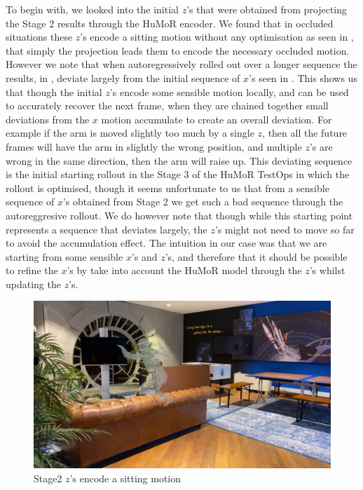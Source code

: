 To begin with, we looked into the initial $z$'s that were obtained from projecting the Stage 2 results through the HuMoR encoder. We found that in occluded situations these $z$'s encode a sitting motion without any optimisation as seen in , that simply the projection leads them to encode the necessary occluded motion. However we note that when autoregressively rolled out over a longer sequence the results, in , deviate largely from the initial sequence of $x$'s seen in . This shows us that though the initial $z$'s encode some sensible motion locally, and can be used to accurately recover the next frame, when they are chained together small deviations from the $x$ motion accumulate to create an overall deviation. For example if the arm is moved slightly too much by a single $z$, then all the future frames will have the arm in slightly the wrong position, and multiple $z$'s are wrong in the same direction, then the arm will raise up. This deviating sequence is the initial starting rollout in the Stage 3 of the HuMoR TestOps in which the rollout is optimised, though it seems unfortunate to us that from a sensible sequence of $x$'s obtained from Stage 2 we get such a bad sequence through the autoreggresive rollout. We do however note that though while this starting point represents a sequence that deviates largely, the $z$'s might not need to move so far to avoid the accumulation effect. The intuition in our case was that we are starting from some sensible $x$'s and $z$'s, and therefore that it should be possible to refine the $x$'s by take into account the HuMoR model through the $z$'s whilst updating the $z$'s. 

\begin{figure}[!ht]
    \centering
    \includegraphics[width=1\textwidth]{Figures/humor/improvement/Rollout_stage_2/sitting_clip/rollout_sitting_example/frame_00000078.jpg}
    \caption{Stage2 $z$'s encode a sitting motion}
    \label{fig:humor_stage_2_rollout_sitting}
\end{figure}


